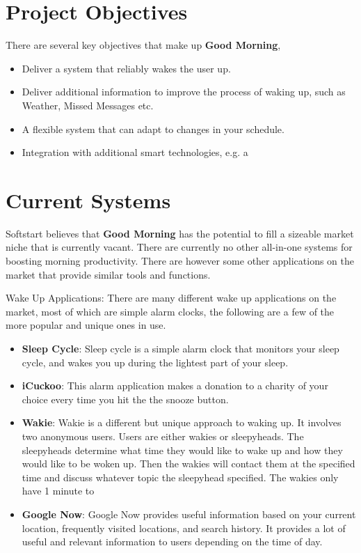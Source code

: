 \documentclass[11pt]{article}
\begin{document}

%
\section{Project Objectives}\label{project-objectives}

There are several key objectives that make up \textbf{Good Morning},

\begin{itemize}
\item
  Deliver a system that reliably wakes the user up.
\item
  Deliver additional information to improve the process of waking up, such as Weather, Missed Messages etc.
\item
  A flexible system that can adapt to changes in your schedule.
\item
  Integration with additional smart technologies, e.g. a 
\end{itemize}


%
\section{Current Systems}\label{current-systems}

Softstart believes that \textbf{Good Morning} has the potential to fill
a sizeable market niche that is currently vacant. There are currently no other all-in-one systems
for boosting morning productivity. There are however some other applications
on the market that provide similar tools and functions.

Wake Up Applications: There are many different wake up applications on the market, most
of which are simple alarm clocks, the following are a few of the more popular and unique ones in use.
\begin{itemize}
\item
    \textbf{Sleep Cycle}: Sleep cycle is a simple alarm clock that monitors your sleep
    cycle, and wakes you up during the lightest part of your sleep.
\item
    \textbf{iCuckoo}: This alarm application makes a donation to a charity of your choice every time you hit the
    the snooze button.
\item
    \textbf{Wakie}: Wakie is a different but unique approach to waking up. It
    involves two anonymous users. Users are either wakies or sleepyheads. 
    The sleepyheads determine what time they would like to wake up and how they would
    like to be woken up. Then the wakies will contact them at the specified time and 
    discuss whatever topic the sleepyhead specified. The wakies only have 1 minute to
\item
	\textbf{Google Now}: Google Now provides useful information based on your current location, frequently
	visited locations, and search history. It provides a lot of useful and relevant information to users
	depending on the time of day.
\end{itemize}
\end{document}
